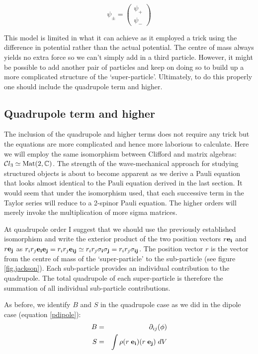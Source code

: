 \begin{equation}
\psi_\pm = 
\begin{pmatrix}
\psi_+\\
\psi_-
\end{pmatrix}
\end{equation}

\noindent This model is limited in what it can achieve as it employed a trick using the difference in potential rather than the actual potential. The centre of mass always yields no extra force so we can't simply add in a third particle. However, it might be possible to add another pair of particles and keep on doing so to build up a more complicated structure of the `super-particle'. Ultimately, to do this properly one should include the quadrupole term and higher.

\subsection{Quadrupole term and higher}
The inclusion of the quadrupole and higher terms does not require any trick but the equations are more complicated and hence more laborious to calculate. Here we will employ the same isomorphism between Clifford and matrix algebras: $\mathcal{C}l_3 \simeq {\rm Mat}(2, {\mathbb C})$. The strength of the wave-mechanical approach for studying structured objects is about to become apparent as we derive a Pauli equation that looks almost identical to the Pauli equation derived in the last section. It would seem that under the isomorphism used, that each successive term in the Taylor series will reduce to a 2-spinor Pauli equation. The higher orders will merely invoke the multiplication of more sigma matrices.

At quadrupole order I suggest that we should use the previously established isomorphism and write the exterior product of the two position vectors $r {\bf e_i}$ and $r {\bf e_j}$ as $ r_i r_j {\bf e_i e_j} = r_i r_j {\bf e_{ij}} \simeq r_i r_j {\bf \sigma_i \sigma_j} =  r_i r_j{\bf \sigma_{ij}}$. The position vector $r$ is the vector from the centre of mass of the `super-particle' to the sub-particle (see figure \ref{fig.jackson}). Each sub-particle provides an individual contribution to the quadrupole. The total quadrupole of each super-particle is therefore the summation of all individual sub-particle contributions.

As before, we identify $B$ and $S$ in the quadrupole case as we did in the dipole case (equation \ref{pdipole}):
\begin{eqnarray}
B &=& \partial_{ij}(\phi) \\
S &=& \int \rho (r \;{\bf e_i})(r  \;{\bf e_j})\;dV
\end{eqnarray}

